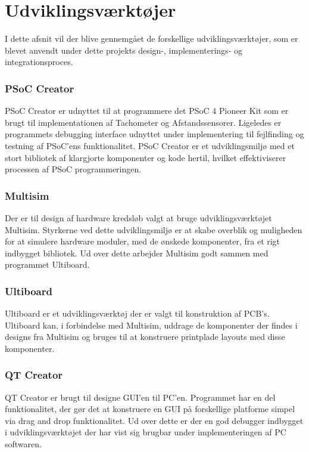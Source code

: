 \chapter{Udviklingsværktøjer} \label{ch:udviklingsvaerktoejer}
I dette afsnit vil der blive gennemgået de forskellige udviklingsværktøjer, som er blevet anvendt under dette projekts design-, implementerings- og integrationsproces.

\subsection*{PSoC Creator}
PSoC Creator er udnyttet til at programmere det PSoC 4 Pioneer Kit som er brugt til implementationen af Tachometer og Afstandssensorer. Ligeledes er programmets debugging interface udnyttet under implementering til fejlfinding og testning af PSoC'ens funktionalitet.
PSoC Creator er et udviklingsmiljø med et stort bibliotek af klargjorte komponenter og kode hertil, hvilket effektiviserer processen af PSoC programmeringen.

\subsection*{Multisim}
Der er til design af hardware kredsløb valgt at bruge udviklingsværktøjet Multisim. Styrkerne ved dette udviklingsmiljø er at skabe overblik og muligheden for at simulere hardware moduler, med de ønskede komponenter, fra et rigt indbygget bibliotek. Ud over dette arbejder Multisim godt sammen med programmet Ultiboard.

\subsection*{Ultiboard}
Ultiboard er et udviklingsværktøj der er valgt til konstruktion af PCB's. Ultiboard kan, i forbindelse med Multisim, uddrage de komponenter der findes i designs fra Multisim og bruges til at konstruere printplade layouts med disse komponenter.

\subsection*{QT Creator}
QT Creator er brugt til designe GUI'en til PC'en. Programmet har en del funktionalitet, der gør det at konstruere en GUI på forskellige platforme simpel via drag and drop funktionalitet. Ud over dette er der en god debugger indbygget i udviklingsværktøjet der har vist sig brugbar under implementeringen af PC softwaren.

